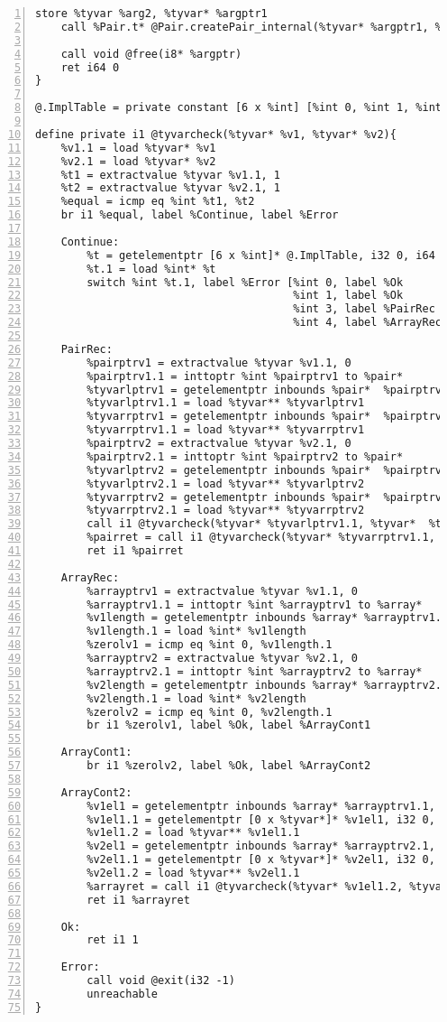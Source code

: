 \begin{lstlisting}[frame=single,numbers=left, language={[x86masm]Assembler}, caption={[Pair Structure: LLVM]Translation of the Pair structure.},
label=llvm:polymorphic]
	store %tyvar %arg2, %tyvar* %argptr1
	call %Pair.t* @Pair.createPair_internal(%tyvar* %argptr1, %tyvar* %argptr1)

	call void @free(i8* %argptr)
	ret i64 0
}

@.ImplTable = private constant [6 x %int] [%int 0, %int 1, %int 2, %int 3, %int 4, %int 2]

define private i1 @tyvarcheck(%tyvar* %v1, %tyvar* %v2){
	%v1.1 = load %tyvar* %v1
	%v2.1 = load %tyvar* %v2
	%t1 = extractvalue %tyvar %v1.1, 1
	%t2 = extractvalue %tyvar %v2.1, 1
	%equal = icmp eq %int %t1, %t2
	br i1 %equal, label %Continue, label %Error

	Continue:
		%t = getelementptr [6 x %int]* @.ImplTable, i32 0, i64 %t1
		%t.1 = load %int* %t
		switch %int %t.1, label %Error [%int 0, label %Ok
										%int 1, label %Ok
									 	%int 3, label %PairRec
									 	%int 4, label %ArrayRec]

	PairRec:
		%pairptrv1 = extractvalue %tyvar %v1.1, 0
		%pairptrv1.1 = inttoptr %int %pairptrv1 to %pair*
		%tyvarlptrv1 = getelementptr inbounds %pair*  %pairptrv1.1, i32 0, i32 0
		%tyvarlptrv1.1 = load %tyvar** %tyvarlptrv1
		%tyvarrptrv1 = getelementptr inbounds %pair*  %pairptrv1.1, i32 0, i32 0
		%tyvarrptrv1.1 = load %tyvar** %tyvarrptrv1
		%pairptrv2 = extractvalue %tyvar %v2.1, 0
		%pairptrv2.1 = inttoptr %int %pairptrv2 to %pair*
		%tyvarlptrv2 = getelementptr inbounds %pair*  %pairptrv2.1, i32 0, i32 0
		%tyvarlptrv2.1 = load %tyvar** %tyvarlptrv2
		%tyvarrptrv2 = getelementptr inbounds %pair*  %pairptrv2.1, i32 0, i32 0
		%tyvarrptrv2.1 = load %tyvar** %tyvarrptrv2
		call i1 @tyvarcheck(%tyvar* %tyvarlptrv1.1, %tyvar*  %tyvarlptrv2.1)
		%pairret = call i1 @tyvarcheck(%tyvar* %tyvarrptrv1.1, %tyvar*  %tyvarrptrv2.1)
		ret i1 %pairret

	ArrayRec:
		%arrayptrv1 = extractvalue %tyvar %v1.1, 0
		%arrayptrv1.1 = inttoptr %int %arrayptrv1 to %array*
		%v1length = getelementptr inbounds %array* %arrayptrv1.1, i32 0, i32 0
		%v1length.1 = load %int* %v1length
		%zerolv1 = icmp eq %int 0, %v1length.1
		%arrayptrv2 = extractvalue %tyvar %v2.1, 0
		%arrayptrv2.1 = inttoptr %int %arrayptrv2 to %array*
		%v2length = getelementptr inbounds %array* %arrayptrv2.1, i32 0, i32 0
		%v2length.1 = load %int* %v2length
		%zerolv2 = icmp eq %int 0, %v2length.1
		br i1 %zerolv1, label %Ok, label %ArrayCont1

	ArrayCont1:
		br i1 %zerolv2, label %Ok, label %ArrayCont2

	ArrayCont2:
		%v1el1 = getelementptr inbounds %array* %arrayptrv1.1, i32 0, i32 1
		%v1el1.1 = getelementptr [0 x %tyvar*]* %v1el1, i32 0, i32 0
		%v1el1.2 = load %tyvar** %v1el1.1
		%v2el1 = getelementptr inbounds %array* %arrayptrv2.1, i32 0, i32 1
		%v2el1.1 = getelementptr [0 x %tyvar*]* %v2el1, i32 0, i32 0
		%v2el1.2 = load %tyvar** %v2el1.1
		%arrayret = call i1 @tyvarcheck(%tyvar* %v1el1.2, %tyvar* %v2el1.2)
		ret i1 %arrayret

	Ok:
		ret i1 1

	Error:
		call void @exit(i32 -1)
  		unreachable
}
\end{lstlisting}
